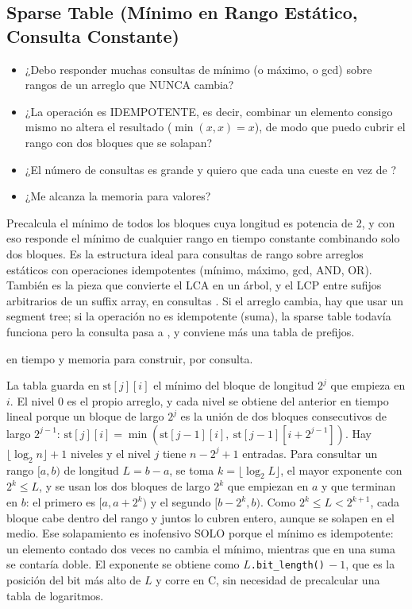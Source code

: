 \subsection{Sparse Table (Mínimo en Rango Estático, Consulta Constante)}
\label{alg:3-6}


\begin{itemize}
\item ¿Debo responder muchas consultas de mínimo (o máximo, o gcd) sobre rangos de un arreglo que NUNCA cambia?
\item ¿La operación es IDEMPOTENTE, es decir, combinar un elemento consigo mismo no altera el resultado ($\min(x,x) = x$), de modo que puedo cubrir el rango con dos bloques que se solapan?
\item ¿El número de consultas es grande y quiero que cada una cueste  en vez de ?
\item ¿Me alcanza la memoria para  valores?
\end{itemize}

 Precalcula el mínimo de todos los bloques cuya longitud es potencia de 2, y con eso responde el mínimo de cualquier rango en tiempo constante combinando solo dos bloques. Es la estructura ideal para consultas de rango sobre arreglos estáticos con operaciones idempotentes (mínimo, máximo, gcd, AND, OR). También es la pieza que convierte el LCA en un árbol, y el LCP entre sufijos arbitrarios de un suffix array, en consultas . Si el arreglo cambia, hay que usar un segment tree; si la operación no es idempotente (suma), la sparse table todavía funciona pero la consulta pasa a , y conviene más una tabla de prefijos.

  en tiempo y memoria para construir,  por consulta.

 La tabla guarda en $\mathrm{st}[j][i]$ el mínimo del bloque de longitud $2^j$ que empieza en $i$. El nivel 0 es el propio arreglo, y cada nivel se obtiene del anterior en tiempo lineal porque un bloque de largo $2^j$ es la unión de dos bloques consecutivos de largo $2^{j-1}$: $\mathrm{st}[j][i] = \min(\mathrm{st}[j-1][i],\ \mathrm{st}[j-1][i + 2^{j-1}])$. Hay $\lfloor \log_2 n \rfloor + 1$ niveles y el nivel $j$ tiene $n - 2^j + 1$ entradas. Para consultar un rango $[a, b)$ de longitud $L = b - a$, se toma $k = \lfloor \log_2 L \rfloor$, el mayor exponente con $2^k \le L$, y se usan los dos bloques de largo $2^k$ que empiezan en $a$ y que terminan en $b$: el primero es $[a, a + 2^k)$ y el segundo $[b - 2^k, b)$. Como $2^k \le L < 2^{k+1}$, cada bloque cabe dentro del rango y juntos lo cubren entero, aunque se solapen en el medio. Ese solapamiento es inofensivo SOLO porque el mínimo es idempotente: un elemento contado dos veces no cambia el mínimo, mientras que en una suma se contaría doble. El exponente se obtiene como $L$\texttt{.bit\_length()}$\,- 1$, que es la posición del bit más alto de $L$ y corre en C, sin necesidad de precalcular una tabla de logaritmos.~\cite{bender2000}

